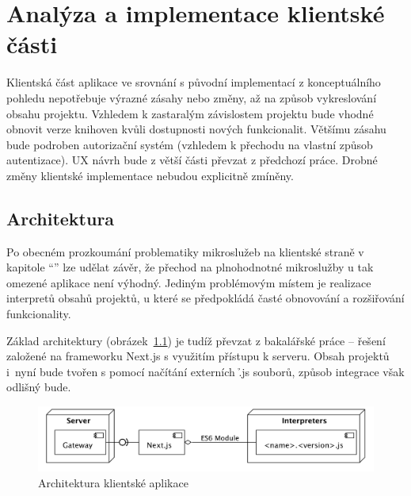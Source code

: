 \chapter{Analýza a implementace klientské části}\label{ch:client}


Klientská část aplikace ve srovnání s původní implementací z konceptuálního pohledu nepotřebuje výrazné zásahy nebo změny, až na způsob vykreslování obsahu projektu.
Vzhledem k zastaralým závislostem projektu bude vhodné obnovit verze knihoven kvůli dostupnosti nových funkcionalit.
Většímu zásahu bude podroben autorizační systém (vzhledem k přechodu na vlastní způsob autentizace).
UX návrh bude z větší části převzat z předchozí práce.
Drobné změny klientské implementace nebudou explicitně zmíněny.



\section{Architektura}\label{sec:client-arch}
Po obecném prozkoumání problematiky mikroslužeb na klientské straně v kapitole \enquote{} lze udělat závěr, že přechod na plnohodnotné mikroslužby u tak omezené aplikace není výhodný.
Jediným problémovým místem je realizace interpretů obsahů projektů, u které se předpokládá časté obnovování a rozšiřování funkcionality.

Základ architektury (obrázek~\ref{fig:client-arch}) je tudíž převzat z bakalářské práce – řešení založené na frameworku Next.js s využitím  přístupu k serveru.
Obsah projektů i~nyní bude tvořen s pomocí načítání externích \h{.js} souborů, způsob integrace však odlišný bude.


\begin{figure}[htbp]
   \centering
   \includegraphics[max width=\textwidth]{assets/fe-arch}
   \caption{Architektura klientské aplikace}\label{fig:client-arch}
\end{figure}



